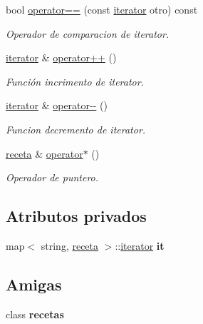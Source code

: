 \begin{DoxyCompactItemize}
bool \hyperlink{classrecetas_1_1iterator_ab8e6b3561483a54ee6469be09c8ddee6}{operator==} (const \hyperlink{classrecetas_1_1iterator}{iterator} otro) const
\begin{DoxyCompactList}\small\item\em Operador de comparacion de iterator. \end{DoxyCompactList}\item 
\hyperlink{classrecetas_1_1iterator}{iterator} \& \hyperlink{classrecetas_1_1iterator_a46b9341b6477309554abc562b1cbbcb7}{operator++} ()
\begin{DoxyCompactList}\small\item\em Función incrimento de iterator. \end{DoxyCompactList}\item 
\hyperlink{classrecetas_1_1iterator}{iterator} \& \hyperlink{classrecetas_1_1iterator_acd93e50f3790178073f67b399863ca38}{operator-\/-\/} ()
\begin{DoxyCompactList}\small\item\em Funcion decremento de iterator. \end{DoxyCompactList}\item 
\hyperlink{classreceta}{receta} \& \hyperlink{classrecetas_1_1iterator_a106a2ead5d5049e84764e6d45dba377a}{operator$\ast$} ()
\begin{DoxyCompactList}\small\item\em Operador de puntero. \end{DoxyCompactList}\end{DoxyCompactItemize}
\subsection*{Atributos privados}
\begin{DoxyCompactItemize}
\item 
\mbox{\label{classrecetas_1_1iterator_a298a7c790e126e79e56bebd784c8b90b}} 
map$<$ string, \hyperlink{classreceta}{receta} $>$\+::\hyperlink{classrecetas_1_1iterator}{iterator} {\bfseries it}
\end{DoxyCompactItemize}
\subsection*{Amigas}
\begin{DoxyCompactItemize}
\item 
\mbox{\label{classrecetas_1_1iterator_a95376bf78fb9fb7122e0a6133eafbffc}} 
class {\bfseries recetas}
\end{DoxyCompactItemize}


